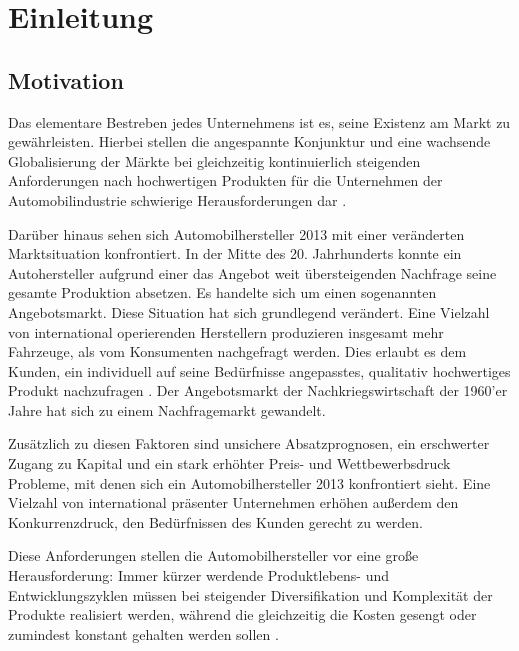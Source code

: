 
\chapter{Einleitung}
\label{cha:Einleitung}
	

\section{Motivation}

Das elementare Bestreben jedes Unternehmens ist es, seine Existenz am Markt zu gew\"ahrleisten. Hierbei stellen die angespannte Konjunktur und eine wachsende  Globalisierung der M\"arkte bei gleichzeitig kontinuierlich steigenden Anforderungen nach hochwertigen Produkten für die Unternehmen der Automobilindustrie schwierige Herausforderungen dar \cite{Piontek98}. 

Dar\"uber hinaus sehen sich Automobilhersteller 2013 mit einer ver\"anderten Marktsituation konfrontiert. In der Mitte des 20. Jahrhunderts konnte ein Autohersteller aufgrund einer das Angebot weit \"ubersteigenden Nachfrage seine gesamte Produktion absetzen. Es handelte sich um einen sogenannten Angebotsmarkt. Diese Situation hat sich grundlegend ver\"andert. Eine Vielzahl von international operierenden Herstellern produzieren insgesamt mehr Fahrzeuge, als vom Konsumenten nachgefragt werden. Dies erlaubt es dem  Kunden, ein individuell auf seine Bed\"urfnisse angepasstes, qualitativ hochwertiges Produkt nachzufragen \cite{Gehr07}. Der Angebotsmarkt der Nachkriegswirtschaft der 1960'er Jahre hat sich zu einem Nachfragemarkt gewandelt.

Zus\"atzlich zu diesen Faktoren sind unsichere Absatzprognosen, ein erschwerter Zugang zu Kapital und ein stark erh\"ohter Preis- und Wettbewerbsdruck Probleme, mit denen sich ein Automobilhersteller 2013 konfrontiert sieht. Eine Vielzahl von international pr\"asenter Unternehmen erh\"ohen au{\ss}erdem den Konkurrenzdruck, den Bed\"urfnissen des Kunden gerecht zu werden.

Diese Anforderungen stellen die Automobilhersteller vor eine gro{\ss}e Herausforderung: Immer k\"urzer werdende Produktlebens- und Entwicklungszyklen m\"ussen bei steigender Diversifikation und Komplexit\"at der Produkte realisiert werden, w\"ahrend die gleichzeitig die Kosten gesengt oder zumindest konstant gehalten werden sollen \cite{proc-disc-2009}.

